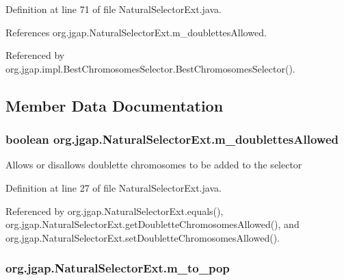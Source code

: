 Definition at line 71 of file Natural\-Selector\-Ext.\-java.



References org.\-jgap.\-Natural\-Selector\-Ext.\-m\-\_\-doublettes\-Allowed.



Referenced by org.\-jgap.\-impl.\-Best\-Chromosomes\-Selector.\-Best\-Chromosomes\-Selector().



\subsection{Member Data Documentation}
\hypertarget{classorg_1_1jgap_1_1_natural_selector_ext_a8898a77160ab046bf8c3c1f62f6a57ca}{
\subsubsection[{m\-\_\-doublettes\-Allowed}]{\setlength{\rightskip}{0pt plus 5cm}boolean org.\-jgap.\-Natural\-Selector\-Ext.\-m\-\_\-doublettes\-Allowed\hspace{0.3cm}{\ttfamily [private]}}}\label{classorg_1_1jgap_1_1_natural_selector_ext_a8898a77160ab046bf8c3c1f62f6a57ca}
Allows or disallows doublette chromosomes to be added to the selector 

Definition at line 27 of file Natural\-Selector\-Ext.\-java.



Referenced by org.\-jgap.\-Natural\-Selector\-Ext.\-equals(), org.\-jgap.\-Natural\-Selector\-Ext.\-get\-Doublette\-Chromosomes\-Allowed(), and org.\-jgap.\-Natural\-Selector\-Ext.\-set\-Doublette\-Chromosomes\-Allowed().

\hypertarget{classorg_1_1jgap_1_1_natural_selector_ext_ac40262bd1c28e951f69abdf34f41ebcc}{
\subsubsection[{m\-\_\-to\-\_\-pop}]{ org.\-jgap.\-Natural\-Selector\-Ext.\-m\-\_\-to\-\_\-pop\hspace{0.3cm}{\ttfamily [private]}}}\label{classorg_1_1jgap_1_1_natural_selector_ext_ac40262bd1c28e951f69abdf34f41ebcc}


